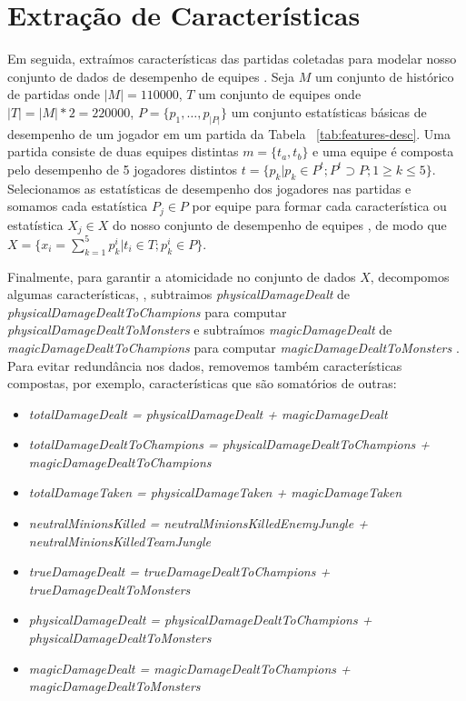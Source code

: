 \section{Extração de Características}

Em seguida, extraímos características das partidas coletadas para modelar nosso conjunto de dados de desempenho de equipes . Seja $M$ um conjunto de histórico de partidas onde $|M|=110000$, $T$ um conjunto de equipes onde $|T|=|M| * 2=220000$, $P=\{p_1, \ldots, p_{|P|}\}$ um conjunto  estatísticas básicas de desempenho de um jogador em um partida da Tabela ~\ref{tab:features-desc}. Uma partida consiste de duas equipes distintas $m=\{t_a,t_b\}$ e uma equipe é composta pelo desempenho de 5 jogadores distintos $t=\{p_k |  p_k \in P^t; P^t \supset P; 1 \geq k \leq 5\}$. Selecionamos as estatísticas de desempenho dos jogadores nas partidas e somamos cada estatística $P_j \in P$ por equipe para formar cada característica ou estatística $X_j \in X$ do nosso conjunto de desempenho de equipes , de modo que $X = \{ x_{i} = \sum_{k=1}^{5} p_{k}^{i} | t_{i} \in T; p_{k}^{i} \in P \}$.

Finalmente, para garantir a atomicidade no conjunto de dados $X$, decompomos algumas características, , subtraimos \textit{physicalDamageDealt} de \textit{physicalDamageDealtToChampions} para computar \textit{physicalDamageDealtToMonsters}  e subtraímos \textit{magicDamageDealt} de \textit{magicDamageDealtToChampions} para computar \textit{magicDamageDealtToMonsters} . Para evitar redundância nos dados, removemos também características compostas, por exemplo, características que são somatórios de outras:

\begin{itemize}
  \item \textit{totalDamageDealt = physicalDamageDealt + magicDamageDealt}
  \item \textit{totalDamageDealtToChampions = physicalDamageDealtToChampions + magicDamageDealtToChampions}
  \item \textit{totalDamageTaken = physicalDamageTaken + magicDamageTaken}
  \item \textit{neutralMinionsKilled = neutralMinionsKilledEnemyJungle + neutralMinionsKilledTeamJungle}
  \item \textit{trueDamageDealt = trueDamageDealtToChampions + trueDamageDealtToMonsters}
  \item \textit{physicalDamageDealt = physicalDamageDealtToChampions + physicalDamageDealtToMonsters}
  \item \textit{magicDamageDealt = magicDamageDealtToChampions + magicDamageDealtToMonsters}
\end{itemize}

